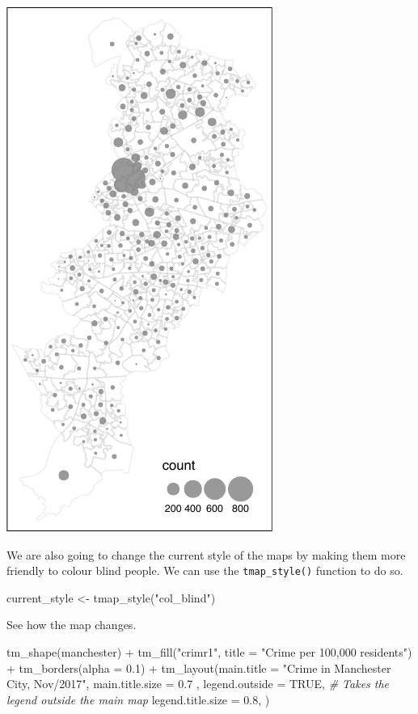 \documentclass[
]{book}
\newenvironment{Shaded}{\begin{snugshade}}{\end{snugshade}}
\newcommand{\AttributeTok}[1]{\textcolor[rgb]{0.77,0.63,0.00}{#1}}
\newcommand{\CommentTok}[1]{\textcolor[rgb]{0.56,0.35,0.01}{\textit{#1}}}
\newcommand{\ConstantTok}[1]{\textcolor[rgb]{0.00,0.00,0.00}{#1}}
\newcommand{\FloatTok}[1]{\textcolor[rgb]{0.00,0.00,0.81}{#1}}
\newcommand{\FunctionTok}[1]{\textcolor[rgb]{0.00,0.00,0.00}{#1}}
\newcommand{\NormalTok}[1]{#1}
\newcommand{\OtherTok}[1]{\textcolor[rgb]{0.56,0.35,0.01}{#1}}
\newcommand{\SpecialCharTok}[1]{\textcolor[rgb]{0.00,0.00,0.00}{#1}}
\newcommand{\StringTok}[1]{\textcolor[rgb]{0.31,0.60,0.02}{#1}}
\begin{document}
\includegraphics{crime_mapping_files/figure-latex/unnamed-chunk-79-1.pdf}

We are also going to change the current style of the maps by making them more friendly to colour blind people. We can use the \texttt{tmap\_style()} function to do so.

\begin{Shaded}
\begin{Highlighting}[]
\NormalTok{current\_style }\OtherTok{\textless{}{-}} \FunctionTok{tmap\_style}\NormalTok{(}\StringTok{"col\_blind"}\NormalTok{)}
\end{Highlighting}
\end{Shaded}

See how the map changes.

\begin{Shaded}
\begin{Highlighting}[]
\FunctionTok{tm\_shape}\NormalTok{(manchester) }\SpecialCharTok{+} 
  \FunctionTok{tm\_fill}\NormalTok{(}\StringTok{"crimr1"}\NormalTok{, }\AttributeTok{title =} \StringTok{"Crime per 100,000 residents"}\NormalTok{) }\SpecialCharTok{+}
  \FunctionTok{tm\_borders}\NormalTok{(}\AttributeTok{alpha =} \FloatTok{0.1}\NormalTok{) }\SpecialCharTok{+}
  \FunctionTok{tm\_layout}\NormalTok{(}\AttributeTok{main.title =} \StringTok{"Crime in Manchester City, Nov/2017"}\NormalTok{, }
            \AttributeTok{main.title.size =} \FloatTok{0.7}\NormalTok{ ,}
            \AttributeTok{legend.outside =} \ConstantTok{TRUE}\NormalTok{,  }\CommentTok{\# Takes the legend outside the main map }
            \AttributeTok{legend.title.size =} \FloatTok{0.8}\NormalTok{,}
\NormalTok{            )}
\end{Highlighting}
\end{Shaded}
\end{document}
